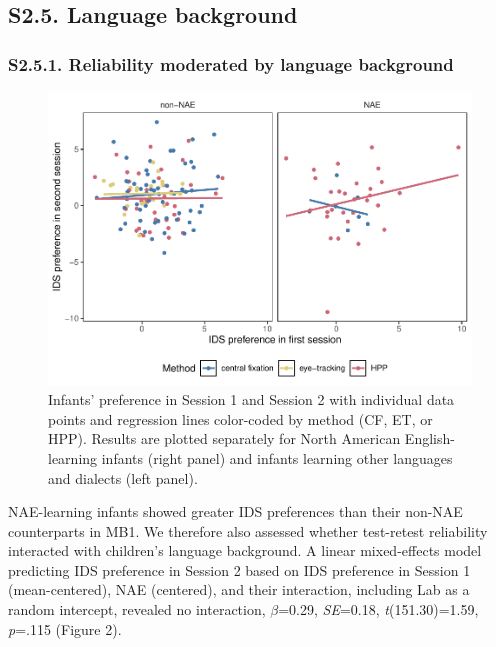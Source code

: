 \documentclass[
  man, donotrepeattitle,floatsintext]{apa6}
\begin{document}
\hypertarget{s2.5.-language-background}{%
\subsection{S2.5. Language background}\label{s2.5.-language-background}}

\hypertarget{s2.5.1.-reliability-moderated-by-language-background}{%
\subsubsection{S2.5.1. Reliability moderated by language background}\label{s2.5.1.-reliability-moderated-by-language-background}}

\begin{figure}
\centering
\includegraphics{MB1T_supplement_files/figure-latex/fig2-1.pdf}
\caption{\label{fig:fig2}Infants' preference in Session 1 and Session 2 with individual data points and regression lines color-coded by method (CF, ET, or HPP). Results are plotted separately for North American English-learning infants (right panel) and infants learning other languages and dialects (left panel).}
\end{figure}

NAE-learning infants showed greater IDS preferences than their non-NAE counterparts in MB1.
We therefore also assessed whether test-retest reliability interacted with children's language background.
A linear mixed-effects model predicting IDS preference in Session 2 based on IDS preference in Session 1 (mean-centered), NAE (centered), and their interaction, including Lab as a random intercept, revealed no interaction, \(\beta\)=0.29, \emph{SE}=0.18, \emph{t}(151.30)=1.59, \emph{p}=.115 (Figure 2).
\end{document}
